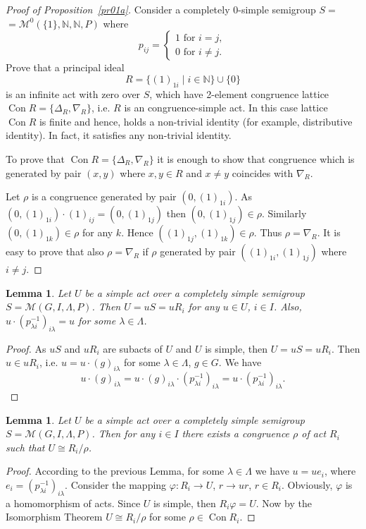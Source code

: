 \documentclass{birkau}
\numberwithin{equation}{section}
\theoremstyle{plain}
\newtheorem{lemma}[theorem]{Lemma}
\theoremstyle{definition}
\DeclareMathOperator{\Con}{Con}
\begin{document}
	\begin{proof}[Proof of Proposition~\ref{pr01a}]
	    Consider a completely 0-simple semigroup $S = $ \newline $ = \mathcal{M}^0(\{1\},\mathbb{N},\mathbb{N},P)$ where
	    $$ p_{ij} =
			\begin{cases}
				1 \text{ for } i = j,\\
				0 \text{ for } i \neq j.
			\end{cases}
		$$
		Prove that a principal ideal $$ R = \{ (1)_{1i} \mid i \in \mathbb{N} \} \cup \{0\} $$ is an infinite act with zero over $S$, which have 2-element congruence lattice  $\Con R = \{ \Delta_R, \nabla_R\}$, i.e. $R$ is an congruence-simple act. In this case lattice $\Con R$ is finite and hence, holds a non-trivial identity (for example, distributive identity). In fact, it satisfies any non-trivial identity.
		
		To prove that $\Con R = \{ \Delta_R, \nabla_R \}$ it is enough to show that congruence which is generated by pair $(x,y)$ where $x,y \in R$ and $x \neq y$ coincides with $\nabla_R$.
		
		Let $\rho$ is a congruence generated by pair $(0,(1)_{1i})$. As $(0,(1)_{1i}) \cdot (1)_{ij} = (0,(1)_{1j})$ then $(0,(1)_{1j}) \in \rho$. Similarly $(0,(1)_{1k}) \in \rho$ for any $k$. Hence  \newline $((1)_{1j},(1)_{1k}) \in \rho$. Thus $\rho = \nabla_R$. It is easy to prove that also $\rho = \nabla_R$ if $\rho$ generated by pair $((1)_{1i},(1)_{1j})$ where $i \neq j$.
	\end{proof}
	
	\begin{lemma}   \label{l2.1}
	    Let $U$ be a simple act over a completely simple semigroup $S = \mathcal{M}(G,I,\Lambda,P)$. Then $U = uS = u R_i$ for any $u \in U$, $i \in I$. Also, $u \cdot
	    {(p_{\lambda i}^{-1})}_{i \lambda} = u$ for some $\lambda \in \Lambda$.
	\end{lemma}
	\begin{proof}
	    As $uS$ and $uR_i$ are subacts of $U$ and $U$ is simple, then $U = uS = u R_i$. Then $u \in u R_i$, i.e. $u = u \cdot (g)_{i \lambda}$ for some $\lambda \in \Lambda$, $g \in G$. We have $$ u \cdot {(g)}_{i \lambda} = u \cdot (g)_{i \lambda} \cdot {(p_{\lambda i}^{-1})}_{i \lambda} = u \cdot {(p_{\lambda i}^{-1})}_{i \lambda}.$$
	\end{proof}
	
	\begin{lemma} \label{l2.2}
	    Let $U$ be a simple act over a completely simple semigroup $S = \mathcal{M}(G,I,\Lambda,P)$. Then for any $i \in I$ there exists a congruence $\rho$ of act $R_i$ such that $U \cong {R_i}/{\rho}$.
	\end{lemma}
	\begin{proof}
	    According to the previous Lemma, for some $\lambda \in \Lambda$ we have $u = u e_i$, where $e_i = (p_{\lambda i}^{-1})_{i \lambda}$. Consider the mapping $\varphi: R_i \rightarrow U$, $r \rightarrow ur$, $r \in R_i$. Obviously, $\varphi$ is a homomorphism of acts. Since $U$ is simple, then $R_i \varphi = U$. Now by the Isomorphism Theorem $U \cong {R_i}/{\rho}$ for some $\rho \in \Con R_i$.
	\end{proof}
	
\end{document}
